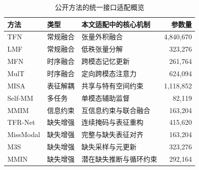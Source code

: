\begin{table}[H]
\centering\small
\caption{公开方法的统一接口适配概览}\label{tab:q2_public_overview}
\begin{tabularx}{.96\textwidth}{@{}l l X r@{}}
\toprule
方法 & 类型 & 本文适配中的核心机制 & 参数量\\
\midrule
TFN\cite{q2tfn} & 常规融合 & 张量外积融合 & 4,840,670\\
LMF\cite{q2lmf} & 常规融合 & 低秩张量分解 & 323,276\\
MFN\cite{q2mfn} & 时序融合 & 跨模态记忆更新 & 261,764\\
MulT\cite{q2mult} & 时序融合 & 定向跨模态注意力 & 624,094\\
MISA\cite{q2misa} & 表征解耦 & 共享与特有空间约束 & 1,118,852\\
Self-MM\cite{q2selfmm} & 多任务 & 单模态辅助监督 & 82,119\\
MMIM\cite{q2mmim} & 信息约束 & 互信息约束与联合融合 & 163,204\\
\addlinespace
TFR-Net\cite{q2tfr} & 缺失增强 & 连续掩码与表征重构 & 415,620\\
MissModal\cite{q2missmodal} & 缺失增强 & 完整与缺失表征对齐 & 163,204\\
M3S\cite{q2m3s} & 缺失增强 & 缺失采样与元更新 & 323,276\\
MMIN\cite{q2mmin} & 缺失增强 & 潜在缺失推断与循环约束 & 292,164\\
\bottomrule
\end{tabularx}
\end{table}